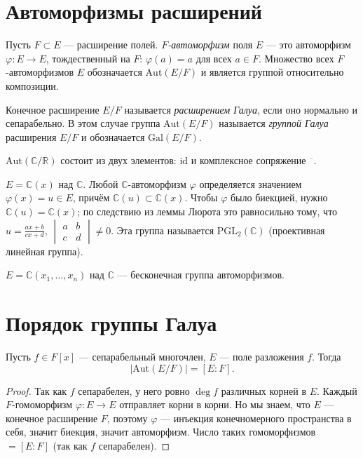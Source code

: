 \section{Автоморфизмы расширений}

\begin{definition}
    Пусть $F \subset E$ --- расширение полей. \emph{$F$-автоморфизм} поля $E$ --- это автоморфизм $\varphi\colon E \to E$,
    тождественный на $F$: $\varphi(a) = a$ для всех $a \in F$.
    Множество всех $F$-автоморфизмов $E$ обозначается $\mathrm{Aut}(E/F)$ и является группой относительно композиции.

    Конечное расширение $E/F$ называется \emph{расширением Галуа}, если оно нормально и сепарабельно.
    В этом случае группа $\mathrm{Aut}(E/F)$ называется \emph{группой Галуа} расширения $E/F$ и обозначается $\mathrm{Gal}(E/F)$.
\end{definition}


\begin{examplelist}
    \item $\mathrm{Aut}(\mathbb{C}/\mathbb{R})$ состоит из двух элементов: $\mathrm{id}$ и комплексное сопряжение
    $\overline{\phantom{z}}$.

    \item $E = \mathbb{C}(x)$ над $\mathbb{C}$. Любой $\mathbb{C}$-автоморфизм $\varphi$ определяется значением
    $\varphi(x) = u \in E$, причём $\mathbb{C}(u) \subset \mathbb{C}(x)$.
    Чтобы $\varphi$ было биекцией, нужно $\mathbb{C}(u) = \mathbb{C}(x)$; по следствию из леммы Люрота это равносильно тому, что $u = \frac{ax + b}{cx + d}$, $\begin{vmatrix} a & b \\ c & d \end{vmatrix} \neq 0$.
    Эта группа называется $\mathrm{PGL}_2(\mathbb{C})$ (проективная линейная группа).

    \item $E = \mathbb{C}(x_1, \dots, x_n)$ над $\mathbb{C}$ --- бесконечная группа автоморфизмов.
\end{examplelist}


\section{Порядок группы Галуа}

\begin{stmt}
    Пусть $f \in F[x]$ --- сепарабельный многочлен, $E$ --- поле разложения $f$. Тогда
    \[
        |\mathrm{Aut}(E/F)| = [E : F].
    \]

    \begin{proof}
        Так как $f$ сепарабелен, у него ровно $\deg f$ различных корней в $E$. Каждый $F$-гомоморфизм
        $\varphi\colon E \to E$ отправляет корни в корни. Но мы знаем, что $E$ --- конечное расширение
        $F$, поэтому $\varphi$ --- инъекция конечномерного пространства в себя, значит биекция, значит автоморфизм.
        Число таких гомоморфизмов $= [E : F]$ (так как $f$ сепарабелен).
    \end{proof}
\end{stmt}


